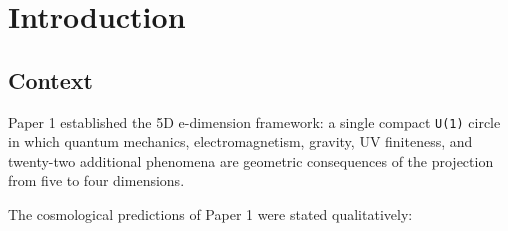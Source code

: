 \documentclass[aps,prd,preprint,superscriptaddress,longbibliography]{revtex4-2}
\begin{document}
\begin{abstract}
All three scenarios predict $N_{eff} = 3.31--3.39$, the framework's most falsifiable near-term prediction. This value is in $3--4\sigma$ tension with ACT DR6 ($N_{eff} = 2.86 \pm 0.13$), though the combined ACT+SPT+Planck measurement ($N_{eff} = 2.81 \pm 0.12$) is itself $1.9\sigma$ below the Standard Model prediction of 3.043, and when SH0ES $H_{0}$ data are included the preferred value shifts to $N_{eff} = 3.43 \pm 0.13$ (Garcia Escudero \& Abazajian 2025) --- consistent with the framework. A CAMB computation of the mirror-sector thermal history shows that mirror $e\pm$ undergo Boltzmann suppression at BBN ($T_{mirror} \approx 0.43$ MeV vs $m_e = 0.511$ MeV), producing a time-varying $\Delta N_{eff}$: at recombination, the effective mirror contribution is $\Delta N_{eff} \approx 0.36$ ($\xi = 0.47$), suppressed by a factor 0.49 relative to the fully relativistic limit, as the mirror $e\pm$ annihilate and heat the mirror photon bath --- giving total $N_{eff} \approx 3.40$. CMB-S4 ($\sigma(N_{eff}) \approx 0.03$) will confirm or exclude the mirror sector at $> 9\sigma$.

CMB-S4 will confirm or exclude the mirror sector at $> 9\sigma$. DESI DR3 will test \texttt{H(z)} at $8\sigma$. Euclid will test \texttt{S8} at $16\sigma$ relative to Planck $\Lambda CDM$. JUNO will test the neutrino mass ordering. The decade 2025--2035 will decide.

\end{abstract}

\maketitle

\section{Introduction}


\subsection{Context}

Paper 1 established the 5D e-dimension framework: a single compact \texttt{U(1)} circle in which quantum mechanics, electromagnetism, gravity, UV finiteness, and twenty-two additional phenomena are geometric consequences of the projection from five to four dimensions.

The cosmological predictions of Paper 1 were stated qualitatively:
\end{document}
